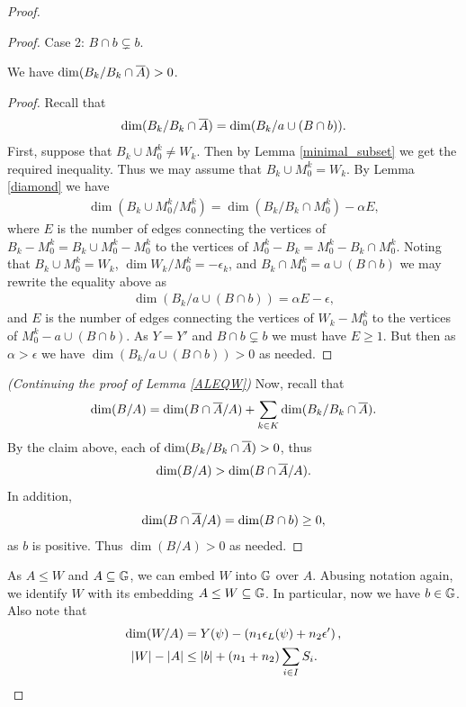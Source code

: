 \begin{proof}
\begin{proof}
    Case 2: $B \cap b \subsetneq b$.
    \begin{Claim} We have $\dim(B_k / B_k \cap \overline{A}) > 0$.
    \end{Claim}
    \begin{proof}
      Recall that
      \begin{align*}
        \dim(B_k / B_k \cap \overline{A}) = \dim(B_k / a \cup (B \cap b)).
      \end{align*}
      First, suppose that $B_k \cup M_0^k \neq W_k$.
      Then by Lemma \ref{minimal_subset} we get the required inequality.
      Thus we may assume that $B_k \cup M_0^k = W_k$.
      By Lemma \ref{diamond} we have
      \begin{align*}
        \dim(B_k \cup M_0^k / M_0^k) = \dim(B_k / B_k \cap M_0^k) - \alpha E,
      \end{align*}
      where $E$ is the number of edges connecting the vertices of
      $B_k - M_0^k = B_k \cup M_0^k - M_0^k$ to the vertices of $M_0^k - B_k = M_0^k - B_k \cap M_0^k$.
      Noting that $B_k \cup M_0^k = W_k$, $\dim{W_k / M_0^k} = -\epsilon_k$, and $B_k \cap M_0^k = a \cup (B \cap b)$
      we may rewrite the equality above as
      \begin{align*}
        \dim(B_k / a \cup (B \cap b)) = \alpha E - \epsilon,
      \end{align*}
      and $E$ is the number of edges connecting the vertices of $W_k - M_0^k$ to the vertices of $M_0^k - a \cup (B \cap b)$.
      As $Y = Y'$ and $B \cap b \subsetneq b$ we must have $E \geq 1$.
      But then as $\alpha > \epsilon$ we have $\dim(B_k / a \cup (B \cap b)) > 0$ as needed.
    \end{proof}
    \textit{(Continuing the proof of Lemma \ref{ALEQW})}
    Now, recall that
    \begin{align*}
      \dim(B/A) = \dim(B \cap \overline{A} / A) + \sum_{k \in K} \dim(B_k/ B_k \cap \overline{A}).
    \end{align*}
    By the claim above, each of $\dim(B_k/ B_k \cap \overline{A}) > 0$, thus
    \begin{align*}
      \dim(B/A) > \dim(B \cap \overline{A} / A).
    \end{align*}
    In addition,
    \begin{align*}
      \dim(B \cap \overline{A} / A) = \dim (B \cap b) \geq 0,
    \end{align*}
    as $b$ is positive.
    Thus $\dim (B/A) > 0$ as needed.
  \end{proof}

  As $A \leq W$ and $A \subseteq \mathbb G$, we can embed $W$ into $\mathbb G$ over $A$.
  Abusing notation again, we identify $W$ with its embedding $A \leq W \subseteq \mathbb G$.
  In particular, now we have $b \in \mathbb G$.
  Also note that
  \begin{align*}
    \dim(W/A) &= Y(\psi) - \left(n_1 \epsilon_L(\psi) + n_2 \epsilon'\right), \\
    |W| - |A| &\leq |b| + (n_1 + n_2) \sum_{i \in I} S_i.
  \end{align*}


\end{proof}
